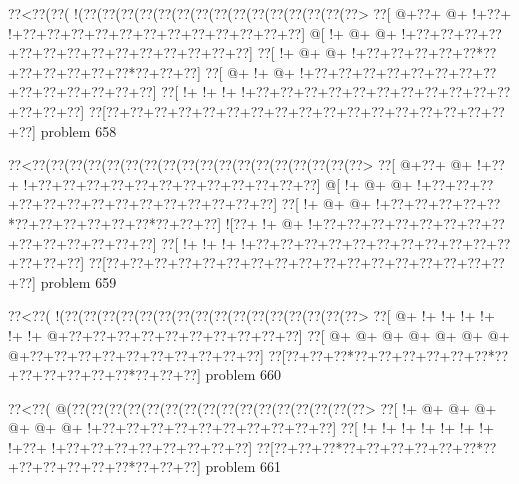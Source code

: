 \vbox{\vbox{\goo
\0??<\0??(\0??(\- !(\0??(\0??(\0??(\0??(\0??(\0??(\0??(\0??(\0??(\0??(\0??(\0??(\0??(\0??(\0??>
\0??[\- @+\0??+\- @+\- !+\0??+\- !+\0??+\0??+\0??+\0??+\0??+\0??+\0??+\0??+\0??+\0??+\0??+\0??]
\- @[\- !+\- @+\- @+\- !+\0??+\0??+\0??+\0??+\0??+\0??+\0??+\0??+\0??+\0??+\0??+\0??+\0??+\0??]
\0??[\- !+\- @+\- @+\- !+\0??+\0??+\0??+\0??+\0??*\0??+\0??+\0??+\0??+\0??+\0??*\0??+\0??+\0??]
\0??[\- @+\- !+\- @+\- !+\0??+\0??+\0??+\0??+\0??+\0??+\0??+\0??+\0??+\0??+\0??+\0??+\0??+\0??]
\0??[\- !+\- !+\- !+\- !+\0??+\0??+\0??+\0??+\0??+\0??+\0??+\0??+\0??+\0??+\0??+\0??+\0??+\0??]
\0??[\0??+\0??+\0??+\0??+\0??+\0??+\0??+\0??+\0??+\0??+\0??+\0??+\0??+\0??+\0??+\0??+\0??+\0??]
}
\hfil problem 658\hfil\break
}



\vbox{\vbox{\goo
\0??<\0??(\0??(\0??(\0??(\0??(\0??(\0??(\0??(\0??(\0??(\0??(\0??(\0??(\0??(\0??(\0??(\0??(\0??>
\0??[\- @+\0??+\- @+\- !+\0??+\- !+\0??+\0??+\0??+\0??+\0??+\0??+\0??+\0??+\0??+\0??+\0??+\0??]
\- @[\- !+\- @+\- @+\- !+\0??+\0??+\0??+\0??+\0??+\0??+\0??+\0??+\0??+\0??+\0??+\0??+\0??+\0??]
\0??[\- !+\- @+\- @+\- !+\0??+\0??+\0??+\0??+\0??*\0??+\0??+\0??+\0??+\0??+\0??*\0??+\0??+\0??]
\- ![\0??+\- !+\- @+\- !+\0??+\0??+\0??+\0??+\0??+\0??+\0??+\0??+\0??+\0??+\0??+\0??+\0??+\0??]
\0??[\- !+\- !+\- !+\- !+\0??+\0??+\0??+\0??+\0??+\0??+\0??+\0??+\0??+\0??+\0??+\0??+\0??+\0??]
\0??[\0??+\0??+\0??+\0??+\0??+\0??+\0??+\0??+\0??+\0??+\0??+\0??+\0??+\0??+\0??+\0??+\0??+\0??]
}
\hfil problem 659\hfil\break
}



\vbox{\vbox{\goo
\0??<\0??(\- !(\0??(\0??(\0??(\0??(\0??(\0??(\0??(\0??(\0??(\0??(\0??(\0??(\0??(\0??(\0??(\0??>
\0??[\- @+\- !+\- !+\- !+\- !+\- !+\- !+\- @+\0??+\0??+\0??+\0??+\0??+\0??+\0??+\0??+\0??+\0??]
\0??[\- @+\- @+\- @+\- @+\- @+\- @+\- @+\- @+\0??+\0??+\0??+\0??+\0??+\0??+\0??+\0??+\0??+\0??]
\0??[\0??+\0??+\0??*\0??+\0??+\0??+\0??+\0??+\0??*\0??+\0??+\0??+\0??+\0??+\0??*\0??+\0??+\0??]
}
\hfil problem 660\hfil\break
}



\vbox{\vbox{\goo
\0??<\0??(\- @(\0??(\0??(\0??(\0??(\0??(\0??(\0??(\0??(\0??(\0??(\0??(\0??(\0??(\0??(\0??(\0??>
\0??[\- !+\- @+\- @+\- @+\- @+\- @+\- @+\- !+\0??+\0??+\0??+\0??+\0??+\0??+\0??+\0??+\0??+\0??]
\0??[\- !+\- !+\- !+\- !+\- !+\- !+\- !+\- !+\0??+\- !+\0??+\0??+\0??+\0??+\0??+\0??+\0??+\0??]
\0??[\0??+\0??+\0??*\0??+\0??+\0??+\0??+\0??+\0??*\0??+\0??+\0??+\0??+\0??+\0??*\0??+\0??+\0??]
}
\hfil problem 661\hfil\break
}



